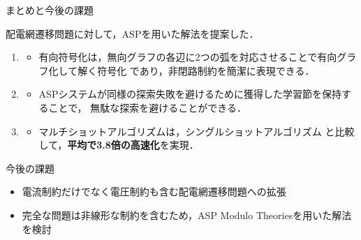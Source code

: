 \documentclass[dvipdfmx,11pt]{beamer}
\begin{document}
\begin{frame}{まとめと今後の課題}
 \begin{alertblock}{}
  \centering
  配電網遷移問題に対して，ASPを用いた解法を提案した．
 \end{alertblock}
 \vfill
  \begin{enumerate}
   \item {}
         \begin{itemize}
          \item 有向符号化は，無向グラフの各辺に2つの弧を対応させることで有向グラフ化して解く符号化
                であり，非閉路制約を簡潔に表現できる．
         \end{itemize}
   \item {}
         \begin{itemize}
          \item ASPシステムが同様の探索失敗を避けるために獲得した学習節を保持することで，
                無駄な探索を避けることができる．
         \end{itemize}
   \item {}
         \begin{itemize}
          \item マルチショットアルゴリズムは，シングルショットアルゴリズム
                と比較して，\textbf{平均で3.8倍の高速化}を実現．
         \end{itemize}
  \end{enumerate}
 \vfill
 \begin{exampleblock}{今後の課題}
\begin{itemize}
 \item 電流制約だけでなく電圧制約も含む配電網遷移問題への拡張
 \item 完全な問題は非線形な制約を含むため，ASP Modulo Theoriesを用いた解法を検討
\end{itemize}
 \end{exampleblock}
\end{frame}
\end{document}
